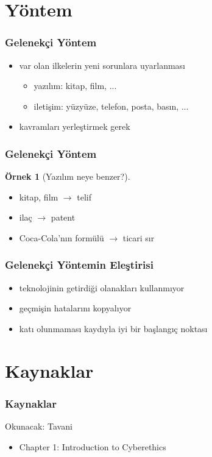 \documentclass[dvipsnames]{beamer}
\theoremstyle{definition}
\theoremstyle{example}
\newtheorem{ornek}[theorem]{Örnek}
\theoremstyle{plain}
\begin{document}
\section{Yöntem}

\begin{frame}
  \frametitle{Gelenekçi Yöntem}

  \begin{itemize}
    \item var olan ilkelerin yeni sorunlara uyarlanması
    \begin{itemize}
      \item yazılım: kitap, film, ...
      \item iletişim: yüzyüze, telefon, posta, basın, ...
    \end{itemize}

    \pause
    \bigskip
    \item kavramları yerleştirmek gerek
  \end{itemize}
\end{frame}

\begin{frame}
  \frametitle{Gelenekçi Yöntem}

  \begin{ornek}[Yazılım neye benzer?]
    \begin{itemize}
      \item kitap, film $\rightarrow$ telif
      \item ilaç $\rightarrow$ patent
      \item Coca-Cola'nın formülü $\rightarrow$ ticari sır
    \end{itemize}
  \end{ornek}
\end{frame}

\begin{frame}
  \frametitle{Gelenekçi Yöntemin Eleştirisi}

  \begin{itemize}
    \item teknolojinin getirdiği olanakları kullanmıyor
    \item geçmişin hatalarını kopyalıyor

    \pause
    \bigskip
    \item katı olunmaması kaydıyla iyi bir başlangıç noktası
  \end{itemize}
\end{frame}

\section*{Kaynaklar}

\begin{frame}
  \frametitle{Kaynaklar}

  \begin{block}{Okunacak: Tavani}
    \begin{itemize}
      \item Chapter 1: \alert{Introduction to Cyberethics}
    \end{itemize}
  \end{block}
\end{frame}
\end{document}
